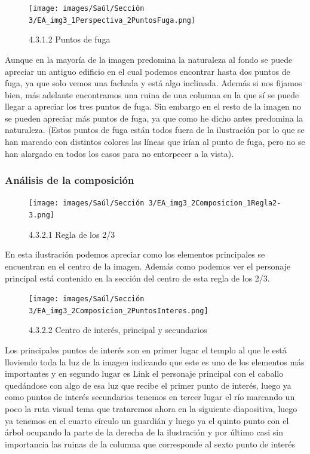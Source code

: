 \documentclass[12pt]{article}
\begin{document}
    \begin{figure}[H]
      \centering
      \texttt{[image: images/Saúl/Sección 3/EA\_img3\_1Perspectiva\_2PuntosFuga.png]}
      \caption{\small 4.3.1.2 Puntos de fuga}
    \end{figure}

    Aunque en la mayoría de la imagen predomina la naturaleza al fondo se puede apreciar un antiguo edificio en el cual podemos encontrar hasta dos puntos de fuga, ya que solo vemos una fachada y está algo inclinada. Además si nos fijamos bien, más adelante encontramos una ruina de una columna en la que sí se puede llegar a apreciar los tres puntos de fuga. Sin embargo en el resto de la imagen no se pueden apreciar más puntos de fuga, ya que como he dicho antes predomina la naturaleza.
(Estos puntos de fuga están todos fuera de la ilustración por lo que se han marcado con distintos colores las líneas que irían al punto de fuga, pero no se han alargado en todos los casos para no entorpecer a la vista).


        \subsubsection{Análisis de la composición}

        
    \begin{figure}[H]
      \centering
      \texttt{[image: images/Saúl/Sección 3/EA\_img3\_2Composicion\_1Regla2-3.png]}
      \caption{\small 4.3.2.1 Regla de los 2/3}
    \end{figure}

En esta ilustración podemos apreciar como los elementos principales se encuentran en el centro de la imagen. Además como podemos ver el personaje principal está contenido en la sección del centro de esta regla de los 2/3.

    \begin{figure}[H]
      \centering
      \texttt{[image: images/Saúl/Sección 3/EA\_img3\_2Composicion\_2PuntosInteres.png]}
      \caption{\small 4.3.2.2 Centro de interés, principal y secundarios}
    \end{figure}

Los principales puntos de interés son en primer lugar el templo al que le está lloviendo toda la luz de la imagen indicando que este es uno de los elementos más importantes y en segundo lugar es Link el personaje principal con el caballo quedándose con algo de esa luz que recibe el primer punto de interés, luego ya como puntos de interés secundarios tenemos en tercer lugar el río marcando un poco la ruta visual tema que trataremos ahora en la siguiente diapositiva, luego ya tenemos en el cuarto círculo un guardián y luego ya el quinto punto con el árbol ocupando la parte de la derecha de la ilustración y por último casi sin importancia las ruinas de la columna que corresponde al sexto punto de interés
\end{document}
